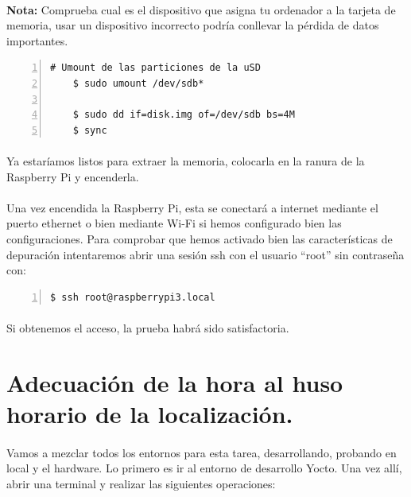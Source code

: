 \paragraph{}\textbf{Nota:} Comprueba cual es el dispositivo que asigna tu ordenador a la tarjeta
de memoria, usar un dispositivo incorrecto podría conllevar la pérdida de datos
importantes.

\begin{lstlisting}[style=consola, numbers=left]
    # Umount de las particiones de la uSD
    $ sudo umount /dev/sdb*

    $ sudo dd if=disk.img of=/dev/sdb bs=4M
    $ sync
\end{lstlisting}

\paragraph{}Ya estaríamos listos para extraer la memoria, colocarla en la ranura de
la Raspberry Pi y encenderla.

\paragraph{}Una vez encendida la Raspberry Pi, esta se conectará a internet mediante
el puerto ethernet o bien mediante Wi-Fi si hemos configurado bien las configuraciones.
Para comprobar que hemos activado bien las características de depuración intentaremos
abrir una sesión ssh con el usuario ``root'' sin contraseña con:

\begin{lstlisting}[style=consola, numbers=left]
    $ ssh root@raspberrypi3.local
\end{lstlisting}

\paragraph{}Si obtenemos el acceso, la prueba habrá sido satisfactoria.

\section{Adecuación de la hora al huso horario de la localización.}

\paragraph{}Vamos a mezclar todos los entornos para esta tarea, desarrollando, probando
en local y el hardware. Lo primero es ir al entorno de desarrollo Yocto. Una vez allí,
abrir una terminal y realizar las siguientes operaciones:

